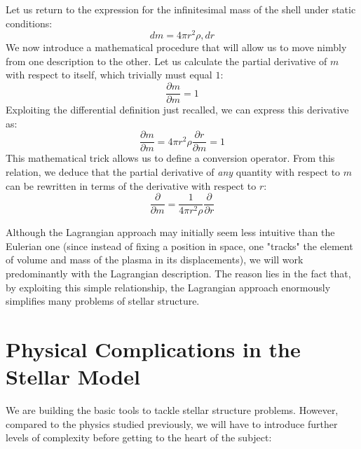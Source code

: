 Let us return to the expression for the infinitesimal mass of the shell under static conditions:
\begin{equation}
dm = 4\pi r^2 \rho , dr
\end{equation}
We now introduce a mathematical procedure that will allow us to move nimbly from one description to the other. Let us calculate the partial derivative of $m$ with respect to itself, which trivially must equal $1$:
\begin{equation}
\frac{\partial m}{\partial m} = 1
\end{equation}
Exploiting the differential definition just recalled, we can express this derivative as:
\begin{equation}
\frac{\partial m}{\partial m} = 4\pi r^2 \rho \frac{\partial r}{\partial m} = 1
\end{equation}
This mathematical trick allows us to define a conversion operator. From this relation, we deduce that the partial derivative of \textit{any} quantity with respect to $m$ can be rewritten in terms of the derivative with respect to $r$:
\begin{equation}
\frac{\partial}{\partial m} = \frac{1}{4\pi r^2 \rho} \frac{\partial}{\partial r}
\end{equation}

Although the Lagrangian approach may initially seem less intuitive than the Eulerian one (since instead of fixing a position in space, one "tracks" the element of volume and mass of the plasma in its displacements), we will work predominantly with the Lagrangian description. The reason lies in the fact that, by exploiting this simple relationship, the Lagrangian approach enormously simplifies many problems of stellar structure.

\section{Physical Complications in the Stellar Model}

We are building the basic tools to tackle stellar structure problems. However, compared to the physics studied previously, we will have to introduce further levels of complexity before getting to the heart of the subject:


